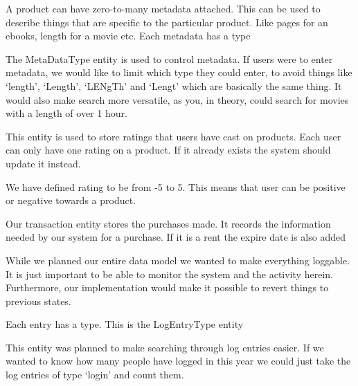 A product can have zero-to-many metadata attached. This can be used to describe things that are specific to the particular product. Like pages for an ebooks, length for a movie etc. Each metadata has a type

The MetaDataType entity is used to control metadata. If users were to enter metadata, we would like to limit which type they could enter, to avoid things like `length', `Length', `LENgTh' and `Lengt' which are basically the same thing. It would also make search more versatile, as you, in theory, could search for movies with a length of over 1 hour.

This entity is used to store ratings that users have cast on products. Each user can only have one rating on a product. If it already exists the system should update it instead.

We have defined rating to be from -5 to 5. This means that user can be positive or negative towards a product.

Our transaction entity stores the purchases made. It records the information needed by our system for a purchase. If it is a rent the expire date is also added

While we planned our entire data model we wanted to make everything loggable. It is just important to be able to monitor the system and the activity herein. Furthermore, our implementation would make it possible to revert things to previous states.

Each entry has a type. This is the LogEntryType entity

This entity was planned to make searching through log entries easier. If we wanted to know how many people have logged in this year we could just take the log entries of type `login' and count them.